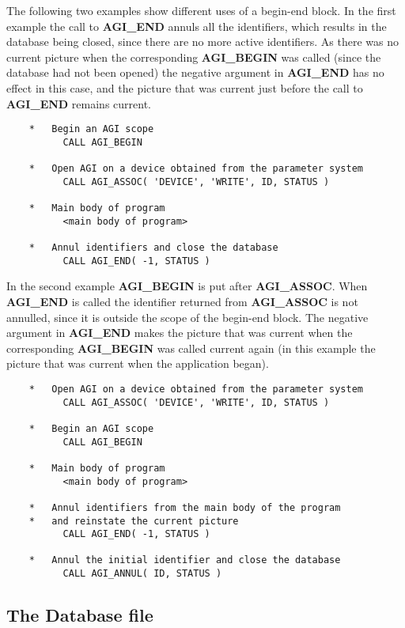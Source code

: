 The following two examples show different uses of a begin-end block.
In the first example the call to {\bf AGI\_END} annuls all the
identifiers, which results in the database being closed, since there
are no more active identifiers. As there was no current picture when
the corresponding {\bf AGI\_BEGIN} was called (since the database had
not been opened) the negative argument in {\bf AGI\_END} has no effect
in this case, and the picture that was current just before the call to
{\bf AGI\_END} remains current.
\begin{verbatim}
    *   Begin an AGI scope
          CALL AGI_BEGIN

    *   Open AGI on a device obtained from the parameter system
          CALL AGI_ASSOC( 'DEVICE', 'WRITE', ID, STATUS )

    *   Main body of program
          <main body of program>

    *   Annul identifiers and close the database
          CALL AGI_END( -1, STATUS )
\end{verbatim}
In the second example {\bf AGI\_BEGIN} is put after {\bf AGI\_ASSOC}.
When {\bf AGI\_END} is called the identifier returned from {\bf AGI\_ASSOC}
is not annulled, since it is outside the scope of the begin-end block.
The negative argument in {\bf AGI\_END} makes the picture that was current
when the corresponding {\bf AGI\_BEGIN} was called current again (in this
example the picture that was current when the application began).
\begin{verbatim}
    *   Open AGI on a device obtained from the parameter system
          CALL AGI_ASSOC( 'DEVICE', 'WRITE', ID, STATUS )

    *   Begin an AGI scope
          CALL AGI_BEGIN

    *   Main body of program
          <main body of program>

    *   Annul identifiers from the main body of the program
    *   and reinstate the current picture
          CALL AGI_END( -1, STATUS )

    *   Annul the initial identifier and close the database
          CALL AGI_ANNUL( ID, STATUS )
\end{verbatim}

\subsection{The Database file}

